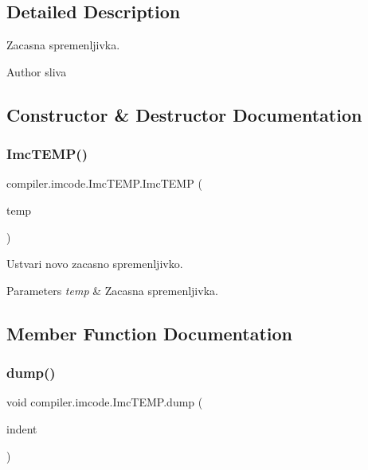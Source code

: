\subsection{Detailed Description}
Zacasna spremenljivka.

\begin{DoxyAuthor}{Author}
sliva 
\end{DoxyAuthor}


\subsection{Constructor \& Destructor Documentation}
\mbox{\label{classcompiler_1_1imcode_1_1_imc_t_e_m_p_a3bb8a4ba1ad1c5438540b1bb68ce1124}} 
\subsubsection{\texorpdfstring{Imc\+T\+E\+M\+P()}{ImcTEMP()}}
{\footnotesize\ttfamily compiler.\+imcode.\+Imc\+T\+E\+M\+P.\+Imc\+T\+E\+MP (\begin{DoxyParamCaption}\item[{\hyperlink{classcompiler_1_1frames_1_1_frm_temp}{Frm\+Temp}}]{temp }\end{DoxyParamCaption})}

Ustvari novo zacasno spremenljivko.


\begin{DoxyParams}{Parameters}
{\em temp} & Zacasna spremenljivka. \\
\hline
\end{DoxyParams}


\subsection{Member Function Documentation}
\mbox{\label{classcompiler_1_1imcode_1_1_imc_t_e_m_p_a82939878ffb278c30d503b0d775626bd}} 
\subsubsection{\texorpdfstring{dump()}{dump()}}
{\footnotesize\ttfamily void compiler.\+imcode.\+Imc\+T\+E\+M\+P.\+dump (\begin{DoxyParamCaption}\item[{int}]{indent }\end{DoxyParamCaption})}

